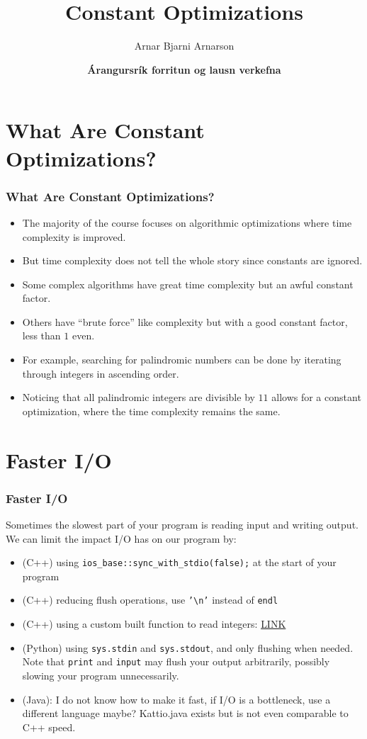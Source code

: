 \documentclass[10pt]{beamer}
\title{Constant Optimizations}
\author{Arnar Bjarni Arnarson}
\institute{\href{http://ru.is/td}{School of Computer Science} \\[2pt] \href{http://ru.is}{Reykjavík University}}
\date{\textbf{Árangursrík forritun og lausn verkefna}}
\begin{document}
\begin{frame}[plain]
    \titlepage
\end{frame}

\section*{What Are Constant Optimizations?}
\begin{frame}[plain]
    \frametitle{What Are Constant Optimizations?}
    \begin{itemize}
        \item The majority of the course focuses on algorithmic optimizations where time complexity is improved.
        \item<2-> But time complexity does not tell the whole story since constants are ignored.
        \item<3-> Some complex algorithms have great time complexity but an awful constant factor.
        \item<4-> Others have ``brute force'' like complexity but with a good constant factor, less than $1$ even.
        \item<5-> For example, searching for palindromic numbers can be done by iterating through integers in ascending order.
        \item<6-> Noticing that all palindromic integers are divisible by $11$ allows for a constant optimization, where the time complexity remains the same.
    \end{itemize}
\end{frame}

\section*{Faster I/O}
\begin{frame}
    \frametitle{Faster I/O}
    Sometimes the slowest part of your program is reading input and writing output.
    We can limit the impact I/O has on our program by:
    \begin{itemize}
        \item<2-> (C++) using \texttt{ios\_base::sync\_with\_stdio(false);} at the start of your program
        \item<3-> (C++) reducing flush operations, use \texttt{'\textbackslash n'} instead of \texttt{endl}
        \item<4-> (C++) using a custom built function to read integers: \href{https://github.com/SuprDewd/CompetitiveProgramming/blob/master/code/tricks/fast_input.cpp}{LINK}
        \item<5-> (Python) using \texttt{sys.stdin} and \texttt{sys.stdout}, and only flushing when needed. Note that \texttt{print} and \texttt{input} may flush your output arbitrarily, possibly slowing your program unnecessarily.
        \item<6-> (Java): I do not know how to make it fast, if I/O is a bottleneck, use a different language maybe? Kattio.java exists but is not even comparable to C++ speed.
    \end{itemize}
\end{frame}
\end{document}
